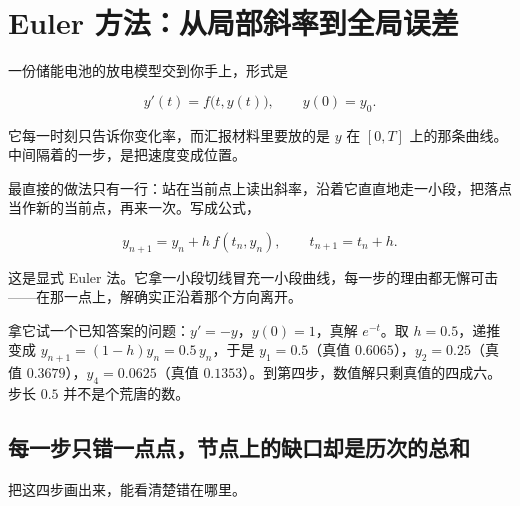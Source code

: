 \section{Euler 方法：从局部斜率到全局误差}
\label{sec:08-Numerical-Analysis/06-ODE/01}

一份储能电池的放电模型交到你手上，形式是

\[
y'(t)=f\bigl(t,y(t)\bigr),\qquad y(0)=y_0 .
\]

它每一时刻只告诉你变化率，而汇报材料里要放的是 \(y\) 在 \([0,T]\) 上的那条曲线。中间隔着的一步，是把速度变成位置。

最直接的做法只有一行：站在当前点上读出斜率，沿着它直直地走一小段，把落点当作新的当前点，再来一次。写成公式，

\[
y_{n+1}=y_n+h\,f(t_n,y_n),\qquad t_{n+1}=t_n+h .
\]

这是显式 Euler 法。它拿一小段切线冒充一小段曲线，每一步的理由都无懈可击——在那一点上，解确实正沿着那个方向离开。

拿它试一个已知答案的问题：\(y'=-y\)，\(y(0)=1\)，真解 \(e^{-t}\)。取 \(h=0.5\)，递推变成 \(y_{n+1}=(1-h)y_n=0.5\,y_n\)，于是 \(y_1=0.5\)（真值 \(0.6065\)），\(y_2=0.25\)（真值 \(0.3679\)），\(y_4=0.0625\)（真值 \(0.1353\)）。到第四步，数值解只剩真值的四成六。步长 \(0.5\) 并不是个荒唐的数。

\subsection{每一步只错一点点，节点上的缺口却是历次的总和}

把这四步画出来，能看清楚错在哪里。

